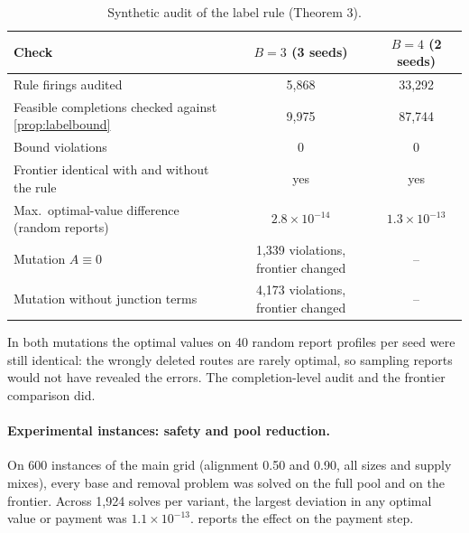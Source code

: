 \documentclass[11pt]{article}
\theoremstyle{definition}
\theoremstyle{remark}
\begin{document}
\begin{table}[!htbp]
\centering
\caption{Synthetic audit of the label rule (Theorem 3).}
\label{tab:audit2}
\small
\begin{tabular}{lcc}
\toprule
Check & $B=3$ (3 seeds) & $B=4$ (2 seeds)\\
\midrule
Rule firings audited & 5,868 & 33,292\\
Feasible completions checked against \cref{prop:labelbound} & 9,975 & 87,744\\
Bound violations & 0 & 0\\
Frontier identical with and without the rule & yes & yes\\
Max.\ optimal-value difference (random reports) & $2.8\times10^{-14}$ & $1.3\times10^{-13}$\\
Mutation $A\equiv0$ & 1,339 violations, frontier changed & --\\
Mutation without junction terms & 4,173 violations, frontier changed & --\\
\bottomrule
\end{tabular}
\end{table}

In both mutations the optimal values on 40 random report profiles per seed were
still identical: the wrongly deleted routes are rarely optimal, so sampling
reports would not have revealed the errors. The completion-level audit and the
frontier comparison did.

\paragraph{Experimental instances: safety and pool reduction.} On 600
instances of the main grid (alignment 0.50 and 0.90, all sizes and supply
mixes), every base and removal problem was solved on the full pool and on the
frontier. Across 1,924 solves per variant, the largest deviation in any optimal
value or payment was $1.1\times10^{-13}$.  reports the effect on
the payment step.
\end{document}

